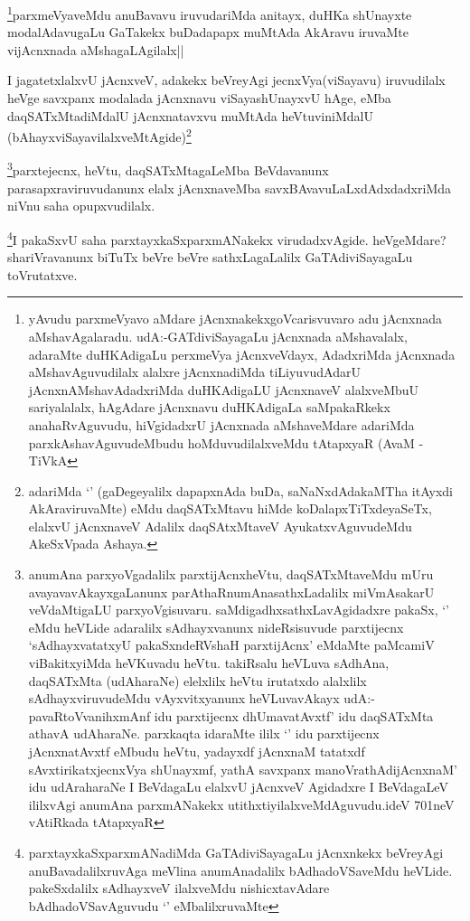 \begin{artha}
\footnote{yAvudu parxmeVyavo aMdare jAcnxnakekxgoVcarisvuvaro adu jAcnxnada aMshavAgalaradu. udA:-GATdiviSayagaLu jAcnxnada aMshavalalx, adaraMte duHKAdigaLu perxmeVya jAcnxveVdayx, AdadxriMda jAcnxnada aMshavAguvudilalx alalxre jAcnxnadiMda tiLiyuvudAdarU jAcnxnAMshavAdadxriMda duHKAdigaLU jAcnxnaveV alalxveMbuU sariyalalalx, hAgAdare jAcnxnavu duHKAdigaLa saMpakaRkekx anahaRvAguvudu, hiVgidadxrU jAcnxnada aMshaveMdare adariMda parxkAshavAguvudeMbudu hoMduvudilalxveMdu tAtapxyaR (AvaM -TiVkA}parxmeVyaveMdu anuBavavu iruvudariMda anitayx, duHKa shUnayxte modalAdavugaLu GaTakekx buDadapapx muMtAda AkAravu iruvaMte vijAcnxnada aMshagaLAgilalx||
\end{artha}

\begin{artha}
I jagatetxlalxvU jAcnxveV, adakekx beVreyAgi jecnxVya(viSayavu) iruvudilalx heVge savxpanx modalada jAcnxnavu viSayashUnayxvU hAge, eMba daqSATxMtadiMdalU jAcnxnatavxvu muMtAda heVtuviniMdalU (bAhayxviSayavilalxveMtAgide)\footnote{adariMda `\stext' (gaDegeyalilx dapapxnAda buDa, saNaNxdAdakaMTha itAyxdi AkAraviruvaMte) eMdu daqSATxMtavu hiMde koDalapxTiTxdeyaSeTx, elalxvU jAcnxnaveV Adalilx daqSAtxMtaveV AyukatxvAguvudeMdu AkeSxVpada Ashaya.}
\end{artha}

\begin{artha}
\footnote{anumAna parxyoVgadalilx parxtijAcnxheVtu, daqSATxMtaveMdu mUru avayavavAkayxgaLanunx parAthaRnumAnasathxLadalilx miVmAsakarU veVdaMtigaLU parxyoVgisuvaru. saMdigadhxsathxLavAgidadxre pakaSx, `\stext' eMdu heVLide adaralilx sAdhayxvanunx nideRsisuvude parxtijecnx `sAdhayxvatatxyU pakaSxndeRVshaH parxtijAcnx' eMdaMte paMcamiV viBakitxyiMda heVKuvadu heVtu. takiRsalu heVLuva sAdhAna, daqSATxMta (udAharaNe) elelxlilx heVtu irutatxdo alalxlilx sAdhayxviruvudeMdu vAyxvitxyanunx heVLuvavAkayx udA:-pavaRtoVvanihxmAnf idu parxtijecnx dhUmavatAvxtf' idu daqSATxMta athavA udAharaNe. parxkaqta idaraMte ililx `\stext' idu parxtijecnx jAcnxnatAvxtf eMbudu heVtu, yadayxdf jAcnxnaM tatatxdf sAvxtirikatxjecnxVya shUnayxmf, yathA savxpanx manoVrathAdijAcnxnaM' idu udAraharaNe I BeVdagaLu elalxvU jAcnxveV Agidadxre I BeVdagaLeV ililxvAgi anumAna parxmANakekx utithxtiyilalxveMdAguvudu.ideV 701neV vAtiRkada tAtapxyaR}parxtejecnx, heVtu, daqSATxMtagaLeMba BeVdavanunx parasapxraviruvudanunx elalx jAcnxnaveMba savxBAvavuLaLxdAdxdadxriMda niVnu saha opupxvudilalx.
\end{artha}
\begin{artha}
\footnote{parxtayxkaSxparxmANadiMda GaTAdiviSayagaLu jAcnxnkekx beVreyAgi anuBavadalilxruvAga meVlina anumAnadalilx bAdhadoVSaveMdu heVLide. pakeSxdalilx sAdhayxveV ilalxveMdu nishicxtavAdare bAdhadoVSavAguvudu `\stext' eMbalilxruvaMte}I pakaSxvU saha parxtayxkaSxparxmANakekx virudadxvAgide. heVgeMdare? shariVravanunx biTuTx beVre beVre sathxLagaLalilx GaTAdiviSayagaLu toVrutatxve.
\end{artha}

